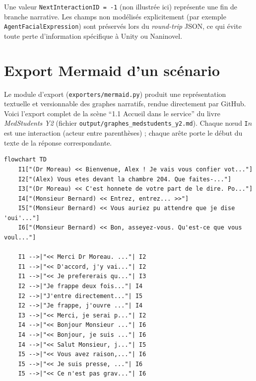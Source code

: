 \noindent Une valeur \texttt{NextInteractionID = -1} (non illustrée ici)
représente une fin de branche narrative. Les champs non modélisés
explicitement (par exemple \texttt{AgentFacialExpression}) sont préservés lors
du \emph{round-trip} JSON, ce qui évite toute perte d'information spécifique
à Unity ou Naninovel.


\chapter{Export Mermaid d'un scénario}
\label{annexe:mermaid}
\renewcommand{\thepage}{\thechapter-\arabic{page}}

Le module d'export (\texttt{exporters/mermaid.py}) produit une représentation
textuelle et versionnable des graphes narratifs, rendue directement par GitHub.
Voici l'export complet de la scène \enquote{1.1 Accueil dans le service} du
livre \emph{MedStudents Y2} (fichier \texttt{output/graphes\_medstudents\_y2.md}).
Chaque n\oe ud \texttt{I$n$} est une interaction (acteur entre parenthèses) ;
chaque arête porte le début du texte de la réponse correspondante.

\begin{lstlisting}[basicstyle=\ttfamily\scriptsize, frame=single, breaklines=true, xleftmargin=1em]
flowchart TD
    I1["(Dr Moreau) << Bienvenue, Alex ! Je vais vous confier vot..."]
    I2["(Alex) Vous etes devant la chambre 204. Que faites-..."]
    I3["(Dr Moreau) << C'est honnete de votre part de le dire. Po..."]
    I4["(Monsieur Bernard) << Entrez, entrez... >>"]
    I5["(Monsieur Bernard) << Vous auriez pu attendre que je dise 'oui'..."]
    I6["(Monsieur Bernard) << Bon, asseyez-vous. Qu'est-ce que vous voul..."]

    I1 -->|"<< Merci Dr Moreau. ..."| I2
    I1 -->|"<< D'accord, j'y vai..."| I2
    I1 -->|"<< Je prefererais qu..."| I3
    I2 -->|"Je frappe deux fois..."| I4
    I2 -->|"J'entre directement..."| I5
    I2 -->|"Je frappe, j'ouvre ..."| I4
    I3 -->|"<< Merci, je serai p..."| I2
    I4 -->|"<< Bonjour Monsieur ..."| I6
    I4 -->|"<< Bonjour, je suis ..."| I6
    I4 -->|"<< Salut Monsieur, j..."| I5
    I5 -->|"<< Vous avez raison,..."| I6
    I5 -->|"<< Je suis presse, ..."| I6
    I5 -->|"<< Ce n'est pas grav..."| I6
\end{lstlisting}

